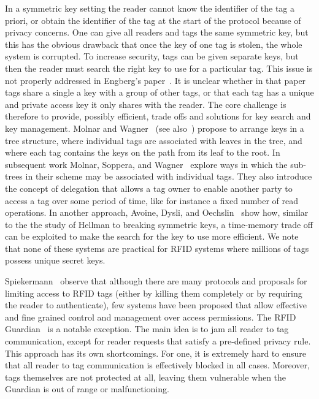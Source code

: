 In a symmetric key setting the reader cannot know the identifier of the tag
a priori, or obtain the identifier of the tag at the start of the protocol 
because of privacy concerns. One can give all readers and tags the
same symmetric key, but this has the obvious drawback that once the key of one
tag is stolen, the whole system is corrupted. To increase security, 
tags can be given separate keys, but then the reader must search the
right key to use for a particular tag.
This issue is not properly addressed
in Engberg's paper~\cite{engberg2004zeroknowledge-rfid}. It is unclear whether
in that paper tags share a single a key with a group of other tags, or that
each tag has a unique and private access key it only shares with the reader.
The core challenge is therefore to provide, possibly
efficient, trade offs and solutions for key search and key management. 
Molnar and Wagner~\cite{DBLP:conf/ccs/MolnarW04} (see also~\cite{DBLP:conf/percom/Dimitriou06})
propose to arrange keys in a tree
structure, where individual tags are associated with leaves in the tree, and
where each tag contains the keys on the path from its leaf to the root.
In subsequent work Molnar, Soppera, and Wagner~\cite{DBLP:conf/sacrypt/MolnarSW05}
explore ways in
which the sub-trees in their scheme may be associated with
individual tags. They also introduce the concept of delegation that allows a
tag owner to enable another party to access a tag over some period of time,
like for instance a fixed number of read operations.
In another approach, 
Avoine, Dysli, and Oechslin~\cite{DBLP:conf/sacrypt/AvoineDO05,DBLP:conf/percom/AvoineO05}
show how, similar to the the study of Hellman
to breaking symmetric keys, 
a time-memory trade off can be exploited to make the search for the key to use
more efficient.
We note that none of these systems are practical for RFID systems where millions of
tags possess unique secret keys.

Spiekermann~\etal\cite{spiekermann2009critical-rfid-pet}
observe that although there are many protocols and proposals for 
limiting access to RFID tags (either by killing them completely or by requiring
the reader to authenticate), few systems have been proposed that
allow effective and fine grained control and management over access
permissions.
The RFID Guardian~\cite{DBLP:conf/lisa/RiebackGCHT06} is a notable exception.
The main idea is to jam all reader to tag communication, except for reader
requests that satisfy a pre-defined privacy rule. This approach
has its own shortcomings. For one, it is extremely hard to ensure that all
reader to tag communication is effectively blocked in all cases. Moreover, tags
themselves are not protected at all, leaving them vulnerable when the Guardian
is out of range or malfunctioning. 

